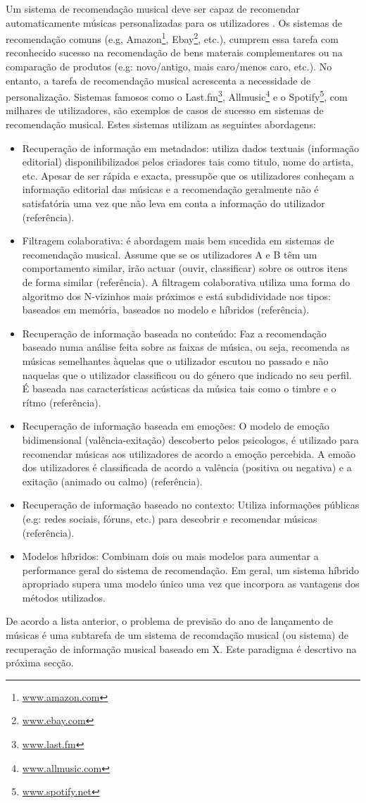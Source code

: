 Um sistema de recomendação musical deve ser capaz de recomendar automaticamente músicas personalizadas para os utilizadores
\citep{Lamere2008}. Os sistemas de recomendação comuns (e.g, Amazon\footnote{\url{www.amazon.com}}, Ebay\footnote{\url{www.ebay.com}}, etc.), 
cumprem essa tarefa com reconhecido sucesso na recomendação de bens materais complementares ou na comparação de produtos (e.g: novo/antigo, 
mais caro/menos caro, etc.). No entanto, a tarefa de recomendação musical acrescenta a necessidade de personalização. Sistemas famosos como o 
Last.fm\footnote{\url{www.last.fm}}, Allmusic\footnote{\url{www.allmusic.com}} e o Spotify\footnote{\url{www.spotify.net}}, com milhares de utilizadores, 
são exemplos de casos de sucesso em sistemas de recomendação musical. Estes sistemas utilizam as seguintes abordagens:

\begin{itemize}
  \item Recuperação de informação em metadados: utiliza dados textuais (informação editorial) disponilibilizados pelos criadores tais como titulo,
nome do artista, etc. Apesar de ser rápida e exacta, pressupõe que os utilizadores conheçam a informação editorial das músicas e a recomendação 
geralmente não é satisfatória uma vez que não leva em conta a informação do utilizador (referência).
  \item Filtragem colaborativa: é abordagem mais bem sucedida em sistemas de recomendação musical. Assume que se os utilizadores A e B têm um 
comportamento similar, irão actuar (ouvir, classificar) sobre os outros itens de forma similar (referência). A filtragem colaborativa utiliza 
uma forma do algoritmo dos N-vizinhos mais próximos e está subdidividade nos tipos: baseados em memória, baseados no modelo e híbridos (referência).
  \item Recuperação de informação baseada no conteúdo: Faz a recomendação baseado numa análise feita sobre as faixas de música, ou seja, recomenda as
músicas semelhantes àquelas que o utilizador escutou no passado e não naquelas que o utilizador classificou ou do género que indicado no seu perfil.
É baseada nas características acústicas da música tais como o timbre e o rítmo (referência).
  \item Recuperação de informação baseada em emoções: O modelo de emoção bidimensional (valência-exitação) descoberto pelos psicologos, é utilizado
para recomendar músicas aos utilizadores de acordo a emoção percebida. A emoão dos utilizadores é classificada de acordo a valência (positiva ou
negativa) e a exitação (animado ou calmo) (referência).
  \item Recuperação de informação baseado no contexto: Utiliza informações públicas (e.g: redes sociais, fóruns, etc.) para descobrir e recomendar 
músicas (referência).
  \item Modelos híbridos: Combinam dois ou mais modelos para aumentar a performance geral do sistema de recomendação. Em geral, um sistema híbrido
apropriado supera uma modelo único uma vez que incorpora as vantagens dos métodos utilizados.
\end{itemize}

De acordo a lista anterior, o problema de previsão do ano de lançamento de músicas é uma subtarefa de um sistema de recomdação musical (ou sistema)
de recuperação de informação musical baseado em X. Este paradigma é descrtivo na próxima secção.